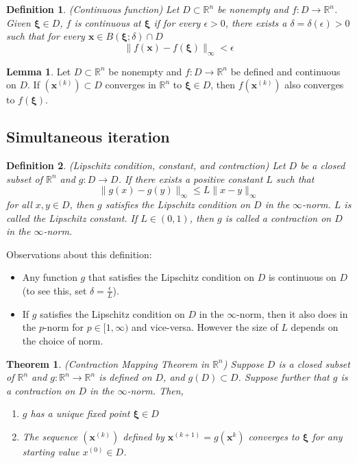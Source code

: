 \documentclass[12pt]{article}
\newtheorem{theorem}{Theorem}
\newtheorem{definition}{Definition}
\theoremstyle{definition}
\newtheorem{lemma}{Lemma}
\newcommand{\e}{\epsilon}
\newcommand{\R}{\mathbb{R}}
\newcommand{\norm}[1]{\lVert#1\rVert}
\newcommand{\x}{\bm{x}}
\newcommand{\xib}{\bm{\xi}}
\begin{document}
\begin{definition}(Continuous function)
Let $D \subset \R^n$ be nonempty and $f: D \to \R^n$. Given $\xib \in D$, $f$ is continuous at $\xib$ if for every $\e > 0$, there exists a $\delta = \delta(\e) > 0$ such that for every $\x \in B(\xib; \delta) \cap D$
\begin{equation}
 	\norm{f(\x) - f(\xib)}_\infty < \e
 \end{equation} 
\end{definition}

\begin{lemma}
Let $D \subset \R^n$ be nonempty and $f: D \to \R^n$ be defined and continuous on $D$. If $(\x^{(k)}) \subset D$ converges in $\R^n$ to $\xib \in D$, then $f(\x^{(k)})$ also converges to $f(\xib)$. 
\end{lemma}

\subsection{Simultaneous iteration}

\begin{definition}(Lipschitz condition, constant, and contraction)
Let $D$ be a closed subset of $\R^n$ and $g: D \to D$. If there exists a positive constant $L$ such that
\begin{equation}
	\norm{g(x) - g(y)}_\infty \leq L \norm{x - y}_\infty
\end{equation}
for all $x, y \in D$, then $g$ satisfies the Lipschitz condition on $D$ in the $\infty$-norm. $L$ is called the Lipschitz constant. If $L \in (0,1)$, then $g$ is called a contraction on $D$ in the $\infty$-norm. 
\end{definition}

Observations about this definition:
\begin{itemize}
	\item Any function $g$ that satisfies the Lipschitz condition on $D$ is continuous on $D$ (to see this, set $\delta = \frac{\e}{L}$). 
	\item If $g$ satisfies the Lipschitz condition on $D$ in the $\infty$-norm, then it also does in the $p$-norm for $p \in [1, \infty)$ and vice-versa. However the size of $L$ depends on the choice of norm. 
\end{itemize}

\begin{theorem}(Contraction Mapping Theorem in $\R^n$)
Suppose $D$ is a closed subset of $\R^n$ and $g: \R^n \to \R^n$ is defined on $D$, and $g(D) \subset D$. Suppose further that $g$ is a contraction on $D$ in the $\infty$-norm. Then,
\begin{enumerate}
	\item $g$ has a unique fixed point $\xib \in D$
	\item The sequence $(\x^{(k)})$ defined by $\x^{(k+1)} = g(\x^{k})$ converges to $\xib$ for any starting value $x^{(0)} \in D$.
\end{enumerate}
\end{theorem}
\end{document}
